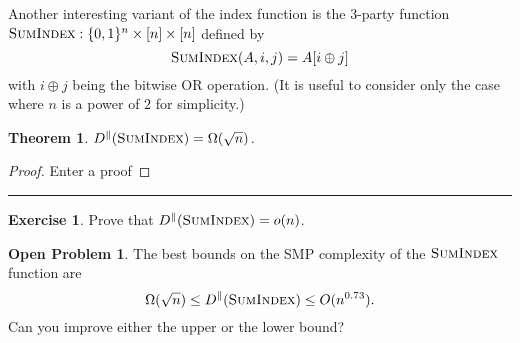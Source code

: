 \documentclass[11pt]{amsart}
\theoremstyle{plain}
\newtheorem{theorem}{Theorem}
\theoremstyle{definition}
\newtheorem{exercise}{Exercise}
\newtheorem{open}{Open Problem}
\theoremstyle{plain}
\newcommand{\SumIndex}{\textsc{SumIndex}}
\newcommand{\exercises}{\bigskip \noindent\rule{8cm}{0.4pt} \medskip}
\begin{document}
Another interesting variant of the index function is the 3-party function $\SumIndex : \{0,1\}^n \times [n] \times [n]$ defined by
\[
\SumIndex(A,i,j) = A[ i \oplus j]
\]
with $i \oplus j$ being the bitwise OR operation. (It is useful to consider only the case where $n$ is a power of $2$ for simplicity.)

\begin{theorem}
$D^\parallel(\SumIndex) = \Omega(\sqrt{n})$.
\end{theorem}

\begin{proof}
Enter a proof

\end{proof}

\exercises

\begin{exercise}
Prove that $D^\parallel(\SumIndex) = o(n)$.
\end{exercise}

\begin{open}
The best bounds on the SMP complexity of the $\SumIndex$ function are
\[
\Omega(\sqrt{n}) \le D^\parallel(\SumIndex) \le O(n^{0.73}).
\]
Can you improve either the upper or the lower bound?
\end{open}
\end{document}
